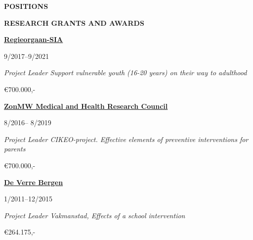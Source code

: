 \documentclass[
  16,
]{article}
\begin{document}
\begin{large}{\bf POSITIONS}
\begin{large}{\bf RESEARCH GRANTS AND AWARDS}
\begin{multicols}{2}
    \begin{flushleft}{\bf \href{https://regieorgaan-sia.nl/}{Regieorgaan-SIA}}\end{flushleft}
    \begin{flushright}9/2017–9/2021\end{flushright}
  \end{multicols}
  \vspace{-0.17cm}
  \begin{multicols}{2}
    \begin{flushleft}\textit{Project Leader Support vulnerable youth (16-20 years) on their way to adulthood}\end
    {flushleft}
    \begin{flushright}€700.000,-  \end
    {flushright}
  \end{multicols}

\vspace{7pt}


\begin{multicols}{2}
    \begin{flushleft}{\bf \href{https://www.zonmw.nl/nl/}{ZonMW Medical and Health Research Council}}\end{flushleft}
    \begin{flushright}8/2016– 8/2019\end{flushright}
  \end{multicols}
  \vspace{-0.17cm}
  \begin{multicols}{2}
    \begin{flushleft}\textit{Project Leader CIKEO-project. Effective elements of preventive interventions for parents}\end
    {flushleft}
    \begin{flushright}€700.000,-  \end
    {flushright}
  \end{multicols}

\vspace{7pt}


\begin{multicols}{2}
    \begin{flushleft}{\bf \href{https://www.deverrebergen.nl/}{De Verre Bergen}}\end{flushleft}
    \begin{flushright}1/2011–12/2015\end{flushright}
  \end{multicols}
  \vspace{-0.17cm}
  \begin{multicols}{2}
    \begin{flushleft}\textit{Project Leader Vakmanstad, Effects of a school intervention}\end
    {flushleft}
    \begin{flushright}€264.175,-  \end
    {flushright}
  \end{multicols}


\end{large}
\end{large}
\end{document}
